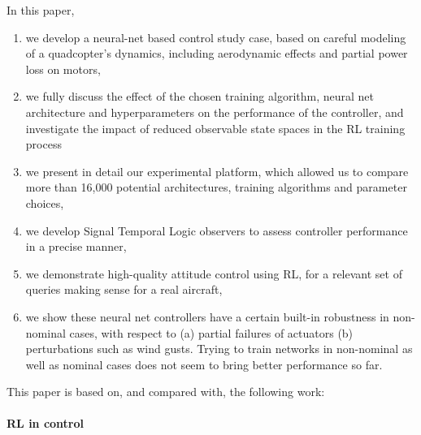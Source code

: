 \documentclass[anonymous=true,format=sigconf, screen=true, review=false]{acmart}
\begin{document}
In this paper, 
\begin{enumerate}
    \item we develop a neural-net based control study case, based on careful modeling of a quadcopter's dynamics, including aerodynamic effects and partial power loss on motors, 
    \item we fully discuss the effect of the chosen training algorithm, neural net architecture and hyperparameters on the performance of the controller, and investigate the impact of reduced observable state spaces in the RL training process
    \item we present in detail our experimental platform, which allowed us to compare more than 16,000 potential architectures, training algorithms and parameter choices,
    \item we develop Signal Temporal Logic observers to assess controller performance in a precise manner,
    \item we demonstrate high-quality attitude control using RL, for a relevant set of queries making sense for a real aircraft,
    \item we show these neural net controllers have a certain built-in robustness in non-nominal cases, with respect to (a) partial failures of actuators (b) perturbations such as wind gusts. Trying to train networks in non-nominal as well as nominal cases does not seem to bring better performance so far. 
\end{enumerate}

This paper is based on, and compared with, the following work: 

\paragraph{RL in control}
\end{document}
